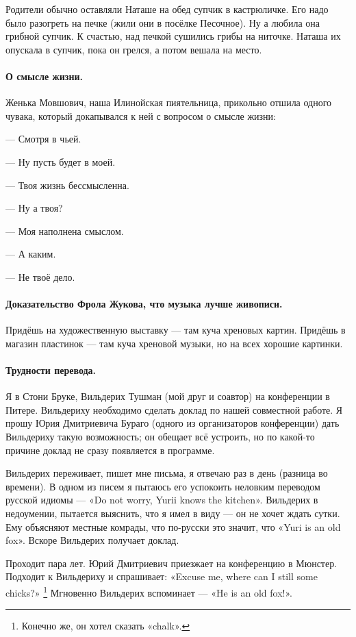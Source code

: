 \documentclass{book}
\begin{document}
Родители обычно оставляли Наташе на обед супчик в кастрюличке.
Его надо было разогреть на печке (жили они в посёлке Песочное).
Ну а любила она грибной супчик.
К счастью, над печкой сушились грибы на ниточке.
Наташа их опускала в супчик, пока он грелся, а потом вешала на место.

\paragraph{О смысле жизни.}
Женька Мовшович, наша Илинойская пиятельница, прикольно отшила одного чувака, который докапывался к ней с вопросом о смысле жизни:

--- Смотря в чьей.

--- Ну пусть будет в моей.

--- Твоя жизнь бессмысленна.

--- Ну а твоя?

--- Моя наполнена смыслом.

--- А каким.

--- Не твоё дело.

\paragraph{Доказательство Фрола Жукова, что музыка лучше живописи.}
Придёшь на художественную выставку --- там куча хреновых картин.
Придёшь в магазин пластинок --- там куча хреновой музыки, но на всех хорошие картинки.

\paragraph{Трудности перевода.}
Я в Стони Бруке, Вильдерих Тушман (мой друг и соавтор) на конференции в Питере.
Вильдериху необходимо сделать доклад по нашей совместной работе.
Я прошу Юрия Дмитриевича Бураго (одного из организаторов конференции) дать Вильдериху такую возможность;
он обещает всё устроить, но по какой-то причине доклад не сразу появляется в программе.

Вильдерих переживает, пишет мне письма, я отвечаю раз в день (разница во времени).
В одном из писем я пытаюсь его успокоить неловким переводом русской идиомы --- «Do not worry, Yurii knows the kitchen».
Вильдерих в недоумении, пытается выяснить, что я имел в виду --- он не хочет ждать сутки.
Ему объясняют местные комрады, что по-русски это значит, что «Yuri is an old fox».
Вскоре Вильдерих получает доклад.

Проходит пара лет.
Юрий Дмитриевич приезжает на конференцию в Мюнстер.
Подходит к Вильдериху и спрашивает: «Excuse me, where can I still some chicks?»%
\footnote{Конечно же, он хотел сказать «chalk».}
Мгновенно Вильдерих вспоминает --- «He is an old fox!».
\end{document}
